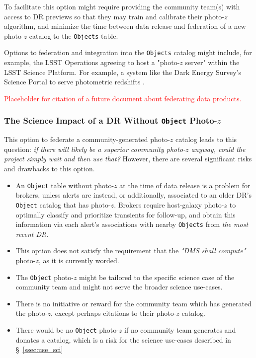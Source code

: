 \documentclass[DM,lsstdraft,toc]{lsstdoc}
\begin{document}
To facilitate this option might require providing the community team(s) with access to DR previews so that they may train and calibrate their photo-$z$ algorithm, and minimize the time between data release and federation of a new photo-$z$ catalog to the {\tt Objects} table.

Options to federation and integration into the {\tt Objects} catalog might include, for example, the LSST Operations agreeing to host a "photo-$z$ server" within the LSST Science Platform. For example, a system like the Dark Energy Survey's Science Portal to serve photometric redshifts \cite{2018A&C....25...58G}.

\textcolor{red}{Placeholder for citation of a future document about federating data products.}

\subsubsection{The Science Impact of a DR Without {\tt Object} Photo-$z$}

This option to federate a community-generated photo-$z$ catalog leads to this question: {\it if there will likely be a superior community photo-$z$ anyway, could the project simply wait and then use that?} However, there are several significant risks and drawbacks to this option.

\begin{itemize}%
\item An {\tt Object} table without photo-$z$ at the time of data release is a problem for brokers, unless alerts are instead, or additionally, associated to an older DR's {\tt Object} catalog that has photo-$z$. Brokers require host-galaxy photo-$z$ to optimally classify and prioritize transients for follow-up, and obtain this information via each alert's associations with nearby {\tt Objects} from {\it the most recent DR}.
\item This option does not satisfy the requirement that the {\it "DMS shall compute"} photo-$z$, as it is currently worded.
\item The {\tt Object} photo-$z$ might be tailored to the specific science case of the community team and might not serve the broader science use-cases.
\item There is no initiative or reward for the community team which has generated the photo-$z$, except perhaps citations to their photo-$z$ catalog.
\item There would be no {\tt Object} photo-$z$ if no community team generates and donates a catalog, which is a risk for the science use-cases described in \S~\ref{ssec:use_sci}
\end{itemize}
\end{document}
